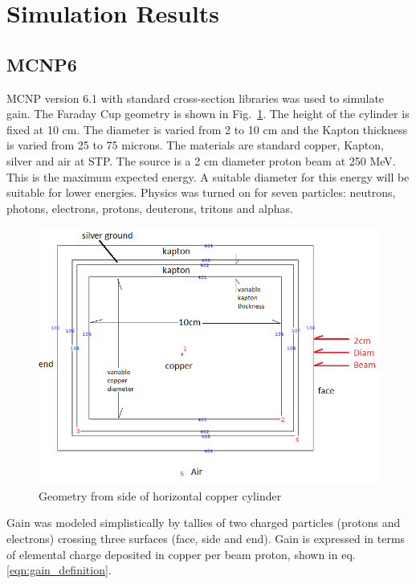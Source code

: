 \documentclass{mc2015}
\begin{document}
\section{Simulation Results}


\subsection{MCNP6}

MCNP version 6.1 with standard cross-section libraries was used to simulate gain. The Faraday Cup geometry is shown in Fig.~\ref{fig:model_geometry}. The height of the cylinder is fixed at 10 cm. The diameter is varied from 2 to 10 cm and the Kapton thickness is varied from 25 to 75 microns. The materials are standard copper, Kapton, silver and air at STP. The source is a 2 cm diameter proton beam at 250 MeV. This is the maximum expected energy. A suitable diameter for this energy will be suitable for lower energies. Physics was turned on for seven particles: neutrons, photons, electrons, protons, deuterons, tritons and alphas.

\begin{figure}[H]
  \centering
  \includegraphics[width=5in]{figures/fig_geometry.png}
  \caption{Geometry from side of horizontal copper cylinder}
  \label{fig:model_geometry}
\end{figure}

Gain was modeled simplistically by tallies of two charged particles (protons and electrons) crossing three surfaces (face, side and end). Gain is expressed in terms of elemental charge deposited in copper per beam proton, shown in eq. \ref{eqn:gain_definition}.
\end{document}
